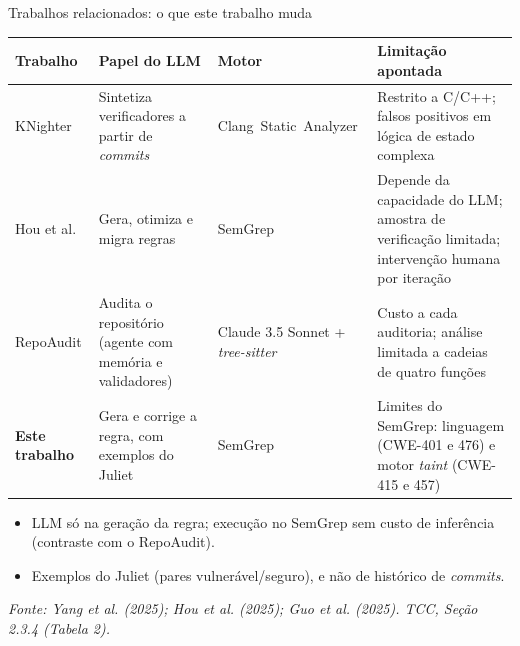 \documentclass[
    aspectratio=169,
    12pt,
    brazil
]{beamer}
\newcommand{\fonte}[1]{{\tiny\itshape Fonte: #1\par}}
\begin{document}
\begin{frame}{Trabalhos relacionados: o que este trabalho muda}
  \scriptsize
  \begin{table}
  \setlength{\tabcolsep}{4pt}
  \begin{tabular}{p{2.0cm}p{3.6cm}p{3.1cm}p{3.7cm}}
  \toprule
  \textbf{Trabalho} & \textbf{Papel do LLM} & \textbf{Motor} & \textbf{Limitação apontada} \\
  \midrule
  KNighter & Sintetiza verificadores a partir de \textit{commits} & \mbox{Clang Static Analyzer} & Restrito a C/C++; falsos positivos em lógica de estado complexa \\
  Hou et al. & Gera, otimiza e migra regras & SemGrep & Depende da capacidade do LLM; amostra de verificação limitada; intervenção humana por iteração \\
  RepoAudit & Audita o repositório (agente com memória e validadores) & Claude 3.5 Sonnet + \textit{tree-sitter} & Custo a cada auditoria; análise limitada a cadeias de quatro funções \\
  \midrule
  \textbf{Este trabalho} & Gera e corrige a regra, com exemplos do Juliet & SemGrep & Limites do SemGrep: linguagem (CWE-401 e 476) e motor \textit{taint} (CWE-415 e 457) \\
  \bottomrule
  \end{tabular}
  \end{table}
  \vspace{0.1cm}
  \begin{itemize}
    \item LLM só na geração da regra; execução no SemGrep sem custo de inferência (contraste com o RepoAudit).
    \item Exemplos do Juliet (pares vulnerável/seguro), e não de histórico de \textit{commits}.
  \end{itemize}
  \vfill
  \fonte{Yang et al. (2025); Hou et al. (2025); Guo et al. (2025). TCC, Seção 2.3.4 (Tabela 2).}
\end{frame}

\end{document}
